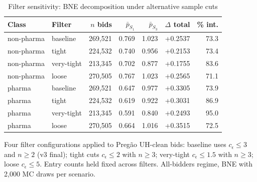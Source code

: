 \begin{table}[htbp]
\centering
\begin{threeparttable}
\caption{Filter sensitivity: BNE decomposition under alternative sample cuts}
\label{tab:v3_filter_sensitivity}
\small
\begin{tabular}{llrrrrr}
\toprule
Class & Filter & $n$ bids & $\bar p_{S_1}$ & $\bar p_{S_3}$ & $\Delta$ total & \% int. \\
\midrule
non-pharma & baseline & 269,521 & 0.769 & 1.023 & +0.2537 & 73.3 \\
non-pharma & tight & 224,532 & 0.740 & 0.956 & +0.2153 & 73.4 \\
non-pharma & very-tight & 213,345 & 0.702 & 0.877 & +0.1755 & 83.6 \\
non-pharma & loose & 270,505 & 0.767 & 1.023 & +0.2565 & 71.1 \\
pharma & baseline & 269,521 & 0.647 & 0.977 & +0.3305 & 73.9 \\
pharma & tight & 224,532 & 0.619 & 0.922 & +0.3031 & 86.9 \\
pharma & very-tight & 213,345 & 0.591 & 0.840 & +0.2493 & 95.0 \\
pharma & loose & 270,505 & 0.664 & 1.016 & +0.3515 & 72.5 \\
\bottomrule
\end{tabular}
\begin{tablenotes}\footnotesize
\item Four filter configurations applied to Preg\~ao UH-clean
bids: baseline uses $c_\epsilon \le 3$ and $n \ge 2$ (v3 final);
tight cuts $c_\epsilon \le 2$ with $n \ge 3$; very-tight
$c_\epsilon \le 1.5$ with $n \ge 3$; loose $c_\epsilon \le 5$.
Entry counts held fixed across filters. All-bidders regime, BNE
with 2{,}000 MC draws per scenario.
\end{tablenotes}
\end{threeparttable}
\end{table}

